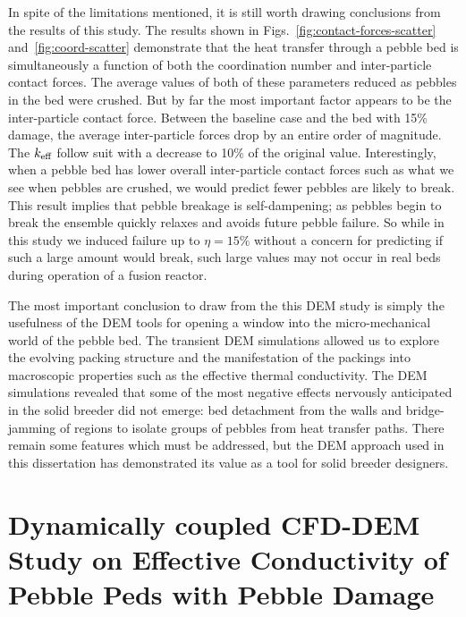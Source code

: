 In spite of the limitations mentioned, it is still worth drawing conclusions from the results of this study. The results shown in Figs.~\ref{fig:contact-forces-scatter} and~\ref{fig:coord-scatter} demonstrate that the heat transfer through a pebble bed is simultaneously a function of both the coordination number and inter-particle contact forces. The average values of both of these parameters reduced as pebbles in the bed were crushed. But by far the most important factor appears to be the inter-particle contact force. Between the baseline case and the bed with 15\% damage, the average inter-particle forces drop by an entire order of magnitude. The $k_\text{eff}$ follow suit with a decrease to 10\% of the original value. Interestingly, when a pebble bed has lower overall inter-particle contact forces such as what we see when pebbles are crushed, we would predict fewer pebbles are likely to break. This result implies that pebble breakage is self-dampening; as pebbles begin to break the ensemble quickly relaxes and avoids future pebble failure. So while in this study we induced failure up to $\eta = 15\%$ without a concern for predicting if such a large amount would break, such large values may not occur in real beds during operation of a fusion reactor. 

The most important conclusion to draw from the this DEM study is simply the usefulness of the DEM tools for opening a window into the micro-mechanical world of the pebble bed. The transient DEM simulations allowed us to explore the evolving packing structure and the manifestation of the packings into macroscopic properties such as the effective thermal conductivity. The DEM simulations revealed that some of the most negative effects nervously anticipated in the solid breeder did not emerge: bed detachment from the walls and bridge-jamming of regions to isolate groups of pebbles from heat transfer paths. There remain some features which must be addressed, but the DEM approach used in this dissertation has demonstrated its value as a tool for solid breeder designers. 














\section{Dynamically coupled CFD-DEM Study on Effective Conductivity of Pebble Peds with Pebble Damage}\label{sec:cfd-dem-studies}

